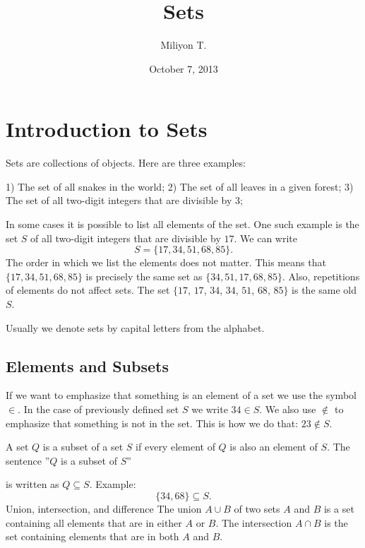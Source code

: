 \documentclass[11pt]{article}
\theoremstyle{definition}
\theoremstyle{plain}
\begin{document}
\nocite{}

\title{Sets}

\author{Miliyon T.}
\date{October 7, 2013}
\maketitle

\section{Introduction to Sets}

Sets are collections of objects. Here are three examples:

1) The set of all snakes in the world;
2) The set of all leaves in a given forest;
3) The set of all two-digit integers that are divisible by \( 3 \);

In some cases it is possible to list all elements of the set. One such example is the set \( S \) of all two-digit integers that are divisible by \( 17 \). We can write \[ S=\{17,34,51,68,85\}.\] The order in which we list the elements does not matter. This means that \( \{17,34,51,68,85\} \) is precisely the same set as \( \{34,51,17,68,85\} \). Also, repetitions of elements do not affect sets. The set \( \{17 \), \( 17 \), \( 34 \), \( 34 \), \( 51 \), \( 68 \), \( 85\} \) is the same old \( S \).

Usually we denote sets by capital letters from the alphabet.

\subsection{Elements and Subsets}

If we want to emphasize that something is an element of a set we use the symbol \( \in \). In the case of previously defined set \( S \) we write \( 34\in S \). We also use \( \not\in \) to emphasize that something is not in the set. This is how we do that: \( 23\not\in S \).

A set \( Q \) is a subset of a set \( S \) if every element of \( Q \) is also an element of \( S \). The sentence
''\( Q \) is a subset of \( S \)''

is written as \( Q\subseteq S \). Example:
\[ \{34,68\}\subseteq S.\]
Union, intersection, and difference
The union \( A\cup B \) of two sets \( A \) and \( B \) is a set containing all elements that are in either \( A \) or \( B \). The intersection \( A\cap B \) is the set containing elements that are in both \( A \) and \( B \).
\end{document}
